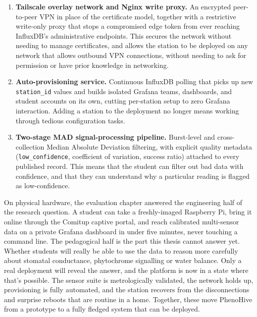 \begin{enumerate}
    \item \textbf{Tailscale overlay network and Nginx write proxy.} An encrypted peer-to-peer VPN in place of the certificate model, together with a restrictive write-only proxy that stops a compromised edge token from ever reaching InfluxDB's administrative endpoints. This secures the network without needing to manage certificates, and allows the station to be deployed on any network that allows outbound VPN connections, without needing to ask for permission or have prior knowledge in networking.

    \item \textbf{Auto-provisioning service.} Continuous InfluxDB polling that picks up new \texttt{station\_id} values and builds isolated Grafana teams, dashboards, and student accounts on its own, cutting per-station setup to zero Grafana interaction. Adding a station to the deployment no longer means working through tedious configuration tasks.

    \item \textbf{Two-stage MAD signal-processing pipeline.} Burst-level and cross-collection Median Absolute Deviation filtering, with explicit quality metadata (\texttt{low\_confidence}, coefficient of variation, success ratio) attached to every published record. This means that the student can filter out bad data with confidence, and that they can understand why a particular reading is flagged as low-confidence.
\end{enumerate}

On physical hardware, the evaluation chapter answered the engineering half of the research question. A student can take a freshly-imaged Raspberry Pi, bring it online through the Comitup captive portal, and reach calibrated multi-sensor data on a private Grafana dashboard in under five minutes, never touching a command line. The pedagogical half is the part this thesis cannot answer yet. Whether students will really be able to use the data to reason more carefully about stomatal conductance, phytochrome signalling or water balance. Only a real deployment will reveal the answer, and the platform is now in a state where that's possible. The sensor suite is metrologically validated, the network holds up, provisioning is fully automated, and the station recovers from the disconnections and surprise reboots that are routine in a home. Together, these move PhenoHive from a prototype to a fully fledged system that can be deployed. 


\endgroup

